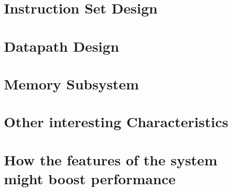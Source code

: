 \documentclass[letterpaper,12pt,titlepage]{article}
\begin{document}
\begin{multicols}{2}
\section*{Instruction Set Design}
\section*{Datapath Design}
\section*{Memory Subsystem}
\section*{Other interesting Characteristics}
\section*{How the features of the system might boost performance}
\end{multicols}

\newpage


\end{document}
